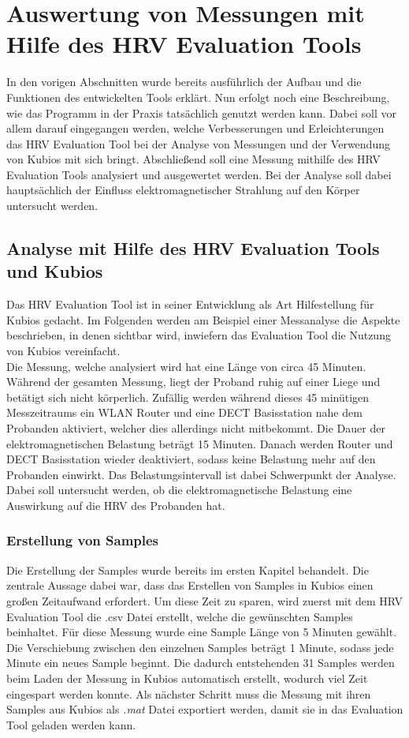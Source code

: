 
\chapter{Auswertung von Messungen mit Hilfe des HRV Evaluation Tools}
In den vorigen Abschnitten wurde bereits ausführlich der Aufbau und die Funktionen des entwickelten Tools erklärt. Nun erfolgt noch eine Beschreibung, wie das Programm in der Praxis tatsächlich genutzt werden kann. Dabei soll vor allem darauf eingegangen werden, welche Verbesserungen und Erleichterungen das HRV Evaluation Tool bei der Analyse von Messungen und der Verwendung von Kubios mit sich bringt. Abschließend soll eine Messung mithilfe des HRV Evaluation Tools analysiert und ausgewertet werden. Bei der Analyse soll dabei hauptsächlich der Einfluss elektromagnetischer Strahlung auf den Körper untersucht werden. 



\section{Analyse mit Hilfe des  HRV Evaluation Tools und Kubios}
Das HRV Evaluation Tool ist in seiner Entwicklung als Art Hilfestellung für Kubios gedacht. Im Folgenden werden am Beispiel einer Messanalyse die Aspekte beschrieben, in denen sichtbar wird, inwiefern das Evaluation Tool die Nutzung von Kubios vereinfacht.\\

Die Messung, welche analysiert wird hat eine Länge von circa 45 Minuten. Während der gesamten Messung, liegt der Proband ruhig auf einer Liege und betätigt sich nicht körperlich. Zufällig werden während dieses 45 minütigen Messzeitraums ein WLAN Router und eine DECT Basisstation nahe dem Probanden aktiviert, welcher dies allerdings nicht mitbekommt. Die Dauer der elektromagnetischen Belastung beträgt 15 Minuten. Danach werden Router und DECT Basisstation wieder deaktiviert, sodass keine Belastung mehr auf den Probanden einwirkt. Das Belastungsintervall ist dabei Schwerpunkt der Analyse. Dabei soll untersucht werden, ob die elektromagnetische Belastung eine Auswirkung auf die HRV des Probanden hat.

\subsection{Erstellung von Samples}
Die Erstellung der Samples wurde bereits im ersten Kapitel behandelt. Die zentrale Aussage dabei war, dass das Erstellen von Samples in Kubios einen großen Zeitaufwand erfordert. Um diese Zeit zu sparen, wird zuerst mit dem HRV Evaluation Tool  die .csv Datei erstellt, welche die gewünschten Samples beinhaltet.
Für diese Messung wurde eine Sample Länge von 5 Minuten gewählt. Die Verschiebung zwischen den einzelnen Samples beträgt 1 Minute, sodass jede Minute ein neues Sample beginnt. Die dadurch entstehenden 31 Samples werden beim Laden der Messung in Kubios automatisch erstellt, wodurch viel Zeit eingespart werden konnte. Als nächster Schritt muss die Messung mit ihren Samples aus Kubios als \textit{.mat} Datei exportiert werden, damit sie in das Evaluation Tool geladen werden kann. 

